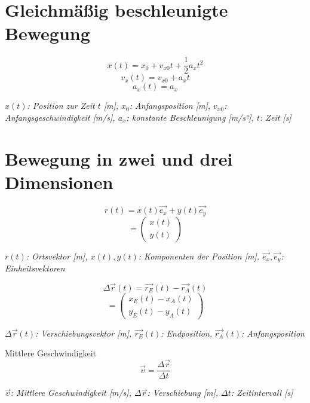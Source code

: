 \documentclass[a4paper,10pt]{article}
\newenvironment{displayformula}
{
	\begin{framed}
		\color{formulaColor}
	}
	{\end{framed}}
\newcommand{\formulalegend}[1]{%
	\par\vspace{0.5ex}%
	{{\color{legendColor}\RaggedRight\small\textit{#1}}}%
	\par\vspace{1.5ex}%
}
\begin{document}
\section{Gleichmäßig beschleunigte Bewegung}

\begin{displayformula}
	\[
	x(t) = x_0 + v_{x0}t + \frac{1}{2} a_x t^2 
	\]
	\[
	v_x(t) = v_{x0} + a_x t
	\]
	\[
	a_x(t) = a_x
	\]
\end{displayformula}
\formulalegend{
	\( x(t) \): Position zur Zeit \( t \) [m], \( x_0 \): Anfangsposition [m], \( v_{x0} \): Anfangsgeschwindigkeit [m/s], \( a_x \): konstante Beschleunigung [m/s²], \( t \): Zeit [s]
}

\section{Bewegung in zwei und drei Dimensionen}

\begin{displayformula}
	\[
	r(t) = x(t)\vec{e_x} + y(t)\vec{e_y}
	\]
	\[
	= \begin{pmatrix}
		x(t) \\
		y(t)
	\end{pmatrix}
	\]
\end{displayformula}
\formulalegend{
	\( r(t) \): Ortsvektor [m], \( x(t), y(t) \): Komponenten der Position [m], \( \vec{e_x}, \vec{e_y} \): Einheitsvektoren
}

\begin{displayformula}
	\[
	\Delta \vec{r}(t) = \vec{r_E}(t) - \vec{r_A}(t)
	\]
	\[
	= \begin{pmatrix}
		x_E(t) - x_A(t) \\
		y_E(t) - y_A(t)
	\end{pmatrix}
	\]
\end{displayformula}
\formulalegend{
	\( \Delta \vec{r}(t) \): Verschiebungsvektor [m], \( \vec{r_E}(t) \): Endposition, \( \vec{r_A}(t) \): Anfangsposition
}

\begin{displayformula}
	Mittlere Geschwindigkeit
	\[
	\vec{v} = \frac{\Delta \vec{r}}{\Delta t}
	\]
\end{displayformula}
\formulalegend{
	\( \vec{v} \): Mittlere Geschwindigkeit [m/s], \( \Delta \vec{r} \): Verschiebung [m], \( \Delta t \): Zeitintervall [s]
}
\end{document}
